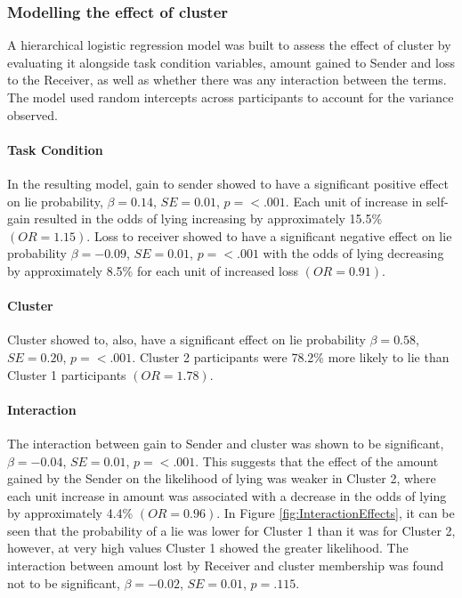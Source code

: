 \documentclass[man, floatsintext]{apa7}
\begin{document}
\subsubsection{Modelling the effect of cluster}

A hierarchical logistic regression model was built to assess the effect of cluster by evaluating it alongside task condition variables, amount gained to Sender and loss to the Receiver, as well as whether there was any interaction between the terms. The model used random intercepts across participants to account for the variance observed.

\paragraph{Task Condition} 
In the resulting model, gain to sender showed to have a significant positive effect on lie probability, $\beta = 0.14$, $SE = 0.01$, $p = < .001$. Each unit of increase in self-gain resulted in the odds of lying increasing by approximately 15.5\% $(OR=1.15)$. Loss to receiver showed to have a significant negative effect on lie probability $\beta = -0.09$, $SE = 0.01$, $p = < .001$ with the odds of lying decreasing by approximately 8.5\% for each unit of increased loss $(OR=0.91)$. 
\paragraph{Cluster} 
Cluster showed to, also, have a significant effect on lie probability $\beta = 0.58$, $SE = 0.20$, $p = < .001$. Cluster 2 participants were 78.2\% more likely to lie than Cluster 1 participants $(OR=1.78)$.
\paragraph{Interaction}
The interaction between gain to Sender and cluster was shown to be significant, $\beta = -0.04$, $SE = 0.01$, $p = < .001$. This suggests that the effect of the amount gained by the Sender on the likelihood of lying was weaker in Cluster 2, where each unit increase in amount was associated with a decrease in the odds of lying by approximately 4.4\% $(OR=0.96)$. In Figure \ref{fig:InteractionEffects}, it can be seen that the probability of a lie was lower for Cluster 1 than it was for Cluster 2, however, at very high values Cluster 1 showed the greater likelihood. The interaction between amount lost by Receiver and cluster membership was found not to be significant, $\beta = -0.02$, $SE = 0.01$, $p = .115$.
\end{document}
